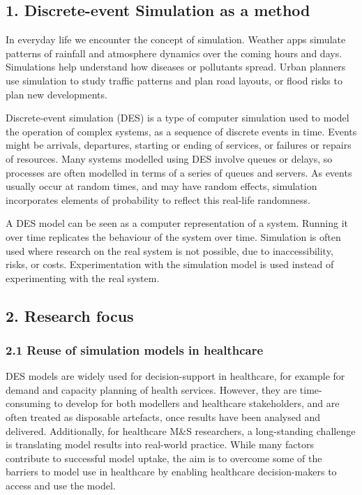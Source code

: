 \documentclass[
  letterpaper,
  DIV=11,
  numbers=noendperiod]{scrreprt}
\begin{document}
\subsection{\texorpdfstring{\textbf{1. Discrete-event Simulation as a
method}}{1. Discrete-event Simulation as a method}}\label{discrete-event-simulation-as-a-method}

In everyday life we encounter the concept of simulation. Weather apps
simulate patterns of rainfall and atmosphere dynamics over the coming
hours and days. Simulations help understand how diseases or pollutants
spread. Urban planners use simulation to study traffic patterns and plan
road layouts, or flood risks to plan new developments.

Discrete-event simulation (DES) is a type of computer simulation used to
model the operation of complex systems, as a sequence of discrete events
in time. Events might be arrivals, departures, starting or ending of
services, or failures or repairs of resources. Many systems modelled
using DES involve queues or delays, so processes are often modelled in
terms of a series of queues and servers. As events usually occur at
random times, and may have random effects, simulation incorporates
elements of probability to reflect this real-life randomness.

A DES model can be seen as a computer representation of a system.
Running it over time replicates the behaviour of the system over time.
Simulation is often used where research on the real system is not
possible, due to inaccessibility, risks, or costs. Experimentation with
the simulation model is used instead of experimenting with the real
system.

\subsection{\texorpdfstring{\textbf{2. Research
focus}}{2. Research focus}}\label{research-focus}

\subsubsection{2.1 Reuse of simulation models in
healthcare}\label{reuse-of-simulation-models-in-healthcare}

DES models are widely used for decision-support in healthcare, for
example for demand and capacity planning of health services. However,
they are time-consuming to develop for both modellers and healthcare
stakeholders, and are often treated as disposable artefacts, once
results have been analysed and delivered. Additionally, for healthcare
M\&S researchers, a long-standing challenge is translating model results
into real-world practice. While many factors contribute to successful
model uptake, the aim is to overcome some of the barriers to model use
in healthcare by enabling healthcare decision-makers to access and use
the model.
\end{document}
